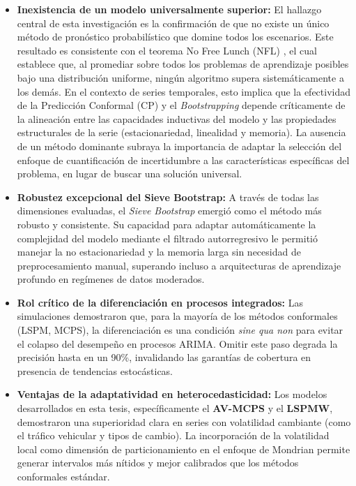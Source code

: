 \begin{itemize}
    \item \textbf{Inexistencia de un modelo universalmente superior:} El hallazgo central de esta investigación es la confirmación de que no existe un único método de pronóstico probabilístico que domine todos los escenarios. Este resultado es consistente con el teorema No Free Lunch (NFL) \cite{wolpert1997no}, el cual establece que, al promediar sobre todos los problemas de aprendizaje posibles bajo una distribución uniforme, ningún algoritmo supera sistemáticamente a los demás. En el contexto de series temporales, esto implica que la efectividad de la Predicción Conformal (CP) y el \textit{Bootstrapping} depende críticamente de la alineación entre las capacidades inductivas del modelo y las propiedades estructurales de la serie (estacionariedad, linealidad y memoria). La ausencia de un método dominante subraya la importancia de adaptar la selección del enfoque de cuantificación de incertidumbre a las características específicas del problema, en lugar de buscar una solución universal.
    
    \item \textbf{Robustez excepcional del Sieve Bootstrap:} A través de todas las dimensiones evaluadas, el \textit{Sieve Bootstrap} emergió como el método más robusto y consistente. Su capacidad para adaptar automáticamente la complejidad del modelo mediante el filtrado autorregresivo le permitió manejar la no estacionariedad y la memoria larga sin necesidad de preprocesamiento manual, superando incluso a arquitecturas de aprendizaje profundo en regímenes de datos moderados.
    
    \item \textbf{Rol crítico de la diferenciación en procesos integrados:} Las simulaciones demostraron que, para la mayoría de los métodos conformales (LSPM, MCPS), la diferenciación es una condición \textit{sine qua non} para evitar el colapso del desempeño en procesos ARIMA. Omitir este paso degrada la precisión hasta en un 90\%, invalidando las garantías de cobertura en presencia de tendencias estocásticas.
    
    \item \textbf{Ventajas de la adaptatividad en heterocedasticidad:} Los modelos desarrollados en esta tesis, específicamente el \textbf{AV-MCPS} y el \textbf{LSPMW}, demostraron una superioridad clara en series con volatilidad cambiante (como el tráfico vehicular y tipos de cambio). La incorporación de la volatilidad local como dimensión de particionamiento en el enfoque de Mondrian permite generar intervalos más nítidos y mejor calibrados que los métodos conformales estándar.
    

\end{itemize}
